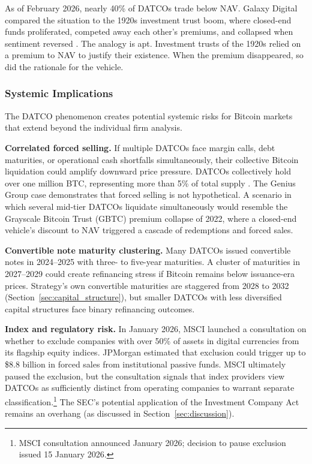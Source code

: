 As of February 2026, nearly 40\% of DATCOs trade below NAV. Galaxy Digital compared the situation to the 1920s investment trust boom, where closed-end funds proliferated, competed away each other's premiums, and collapsed when sentiment reversed \citep{galaxy2026treasury}. The analogy is apt. Investment trusts of the 1920s relied on a premium to NAV to justify their existence. When the premium disappeared, so did the rationale for the vehicle.

\subsubsection{Systemic Implications}

The DATCO phenomenon creates potential systemic risks for Bitcoin markets that extend beyond the individual firm analysis.

\textbf{Correlated forced selling.} If multiple DATCOs face margin calls, debt maturities, or operational cash shortfalls simultaneously, their collective Bitcoin liquidation could amplify downward price pressure. DATCOs collectively hold over one million BTC, representing more than 5\% of total supply \citep{coingecko2025datco}. The Genius Group case demonstrates that forced selling is not hypothetical. A scenario in which several mid-tier DATCOs liquidate simultaneously would resemble the Grayscale Bitcoin Trust (GBTC) premium collapse of 2022, where a closed-end vehicle's discount to NAV triggered a cascade of redemptions and forced sales.

\textbf{Convertible note maturity clustering.} Many DATCOs issued convertible notes in 2024--2025 with three- to five-year maturities. A cluster of maturities in 2027--2029 could create refinancing stress if Bitcoin remains below issuance-era prices. Strategy's own convertible maturities are staggered from 2028 to 2032 (Section~\ref{sec:capital_structure}), but smaller DATCOs with less diversified capital structures face binary refinancing outcomes.

\textbf{Index and regulatory risk.} In January 2026, MSCI launched a consultation on whether to exclude companies with over 50\% of assets in digital currencies from its flagship equity indices. JPMorgan estimated that exclusion could trigger up to \$8.8 billion in forced sales from institutional passive funds. MSCI ultimately paused the exclusion, but the consultation signals that index providers view DATCOs as sufficiently distinct from operating companies to warrant separate classification.\footnote{MSCI consultation announced January 2026; decision to pause exclusion issued 15 January 2026.} The SEC's potential application of the Investment Company Act remains an overhang (as discussed in Section~\ref{sec:discussion}).

